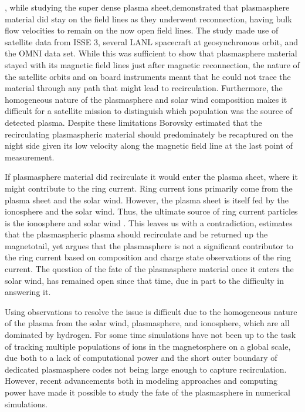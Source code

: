 \documentclass[utf8]{frontiersinFPHY_FAMS}
\begin{document}
\citet[Borovsky et al.(1997)]{Borovsky1997}, while studying the super dense plasma sheet,demonstrated that plasmasphere material did stay on the field lines as they underwent reconnection, having bulk flow velocities to remain on the now open field lines. The study made use of satellite data from ISSE 3, several LANL spacecraft at geosynchronous orbit, and the OMNI data set. While this was sufficient to show that plasmasphere material stayed with its magnetic field lines just after magnetic reconnection, the nature of the satellite orbits and on board instruments meant that he could not trace the material through any path that might lead to recirculation. Furthermore, the homogeneous nature of the plasmasphere and solar wind composition makes it difficult for a satellite mission to distinguish which population was the source of detected plasma. Despite these limitations Borovsky estimated that the recirculating plasmaspheric material should predominately be recaptured on the night side given its low velocity along the magnetic field line at the last point of measurement. 

If plasmasphere material did recirculate it would enter the plasma sheet, where it might contribute to the ring current. Ring current ions primarily come from the plasma sheet and the solar wind. However, the plasma sheet is itself fed by the ionosphere and the solar wind. Thus, the ultimate source of ring current particles is the ionosphere and solar wind \citet[Daglis et al.(1999)]{Daglis1999}. %
This leaves us with a contradiction, \citet{Borovsky1997} estimates that the plasmaspheric plasma should recirculate and be returned up the magnetotail, yet  \citet{Daglis1999} argues that the plasmasphere is not a significant contributor to the ring current based on composition and charge state observations of the ring current. %
 The question of the fate of the plasmasphere material once it enters the solar wind, has remained open since that time, due in part to the difficulty in answering it. 

Using observations to resolve the issue is difficult due to the homogeneous nature of the plasma from the solar wind, plasmasphere, and ionosphere, which are all dominated by hydrogen. For some time simulations have not been up to the task of tracking multiple populations of ions in the magnetosphere on a global scale, due both to a lack of computational power and the short outer boundary of dedicated plasmasphere codes not being large enough to capture recirculation.  However, recent advancements both in modeling approaches and computing power have made it possible to study the fate of the plasmasphere in numerical simulations. 
\end{document}
